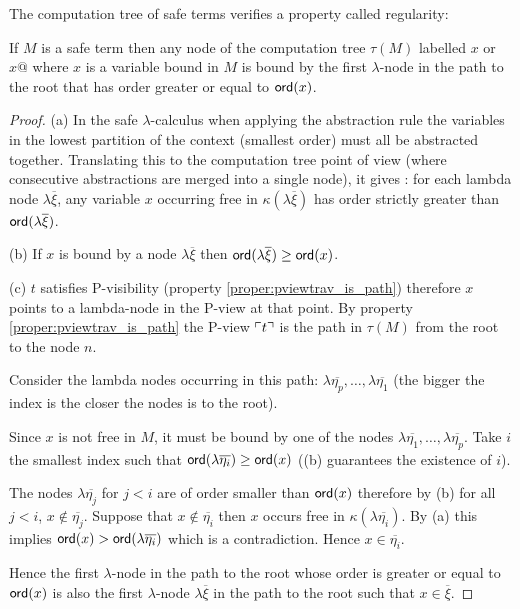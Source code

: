 The computation tree of safe terms verifies a property called regularity:
\begin{property}
\label{proper:regularity}
If $M$ is a safe term then any node of the computation tree $\tau(M)$ labelled $x$ or $x@$ where
$x$ is a variable bound in $M$ is bound by the first $\lambda$-node in the path to the root that has
order greater or equal to ${\sf ord}(x)$.
\end{property}
\begin{proof}
(a) In the safe $\lambda$-calculus when applying the abstraction rule the variables in the lowest partition of the context
(smallest order) must all be abstracted together. Translating this to the computation tree point of view
(where consecutive abstractions are merged into a single node), it gives :
for each lambda node $\lambda \overline{\xi}$, any variable $x$ occurring free in $\kappa(\lambda \overline{\xi})$
has order strictly greater than ${\sf ord}(\lambda \overline{\xi})$.

(b) If $x$ is bound by a node $\lambda \overline{\xi}$ then
${\sf ord}(\lambda \overline{\xi}) \geq {\sf ord}(x)$.

(c) $t$ satisfies P-visibility (property \ref{proper:pviewtrav_is_path}) therefore $x$ points
to a lambda-node in the P-view at that point.
By property \ref{proper:pviewtrav_is_path} the P-view $\ulcorner t \urcorner$ is
the path in $\tau(M)$ from the root to the node $n$.

Consider the lambda nodes occurring in this path:
$\lambda \overline{\eta_p}, \ldots, \lambda \overline{\eta_1}$
(the bigger the index is the closer the nodes is to the root).

Since $x$ is not free in $M$, it must be bound by one of the nodes
$\lambda \overline{\eta_1}, \ldots, \lambda \overline{\eta_p}$.
Take $i$ the smallest index such that ${\sf ord}(\lambda \overline{\eta_i}) \geq {\sf ord}(x)$ ((b) guarantees the existence of $i$).

The nodes $\lambda \overline{\eta_j}$ for $j<i$ are of order smaller than ${\sf ord}(x)$ therefore
by (b) for all $j<i$, $x \not\in \overline{\eta_j}$. Suppose that $x \not\in \overline{\eta_i}$ then $x$ occurs free in
$\kappa(\lambda \overline{\eta_i})$. By (a) this implies
${\sf ord}(x) > {\sf ord}(\lambda \overline{\eta_i})$ which is a contradiction.
Hence $x \in \overline{\eta_i}$.

Hence the first $\lambda$-node in the path to the root whose order is greater or equal to ${\sf ord}(x)$
is also the first $\lambda$-node $\lambda \overline{\xi}$ in the path to the root such that $x \in \overline{\xi}$.
\end{proof}


